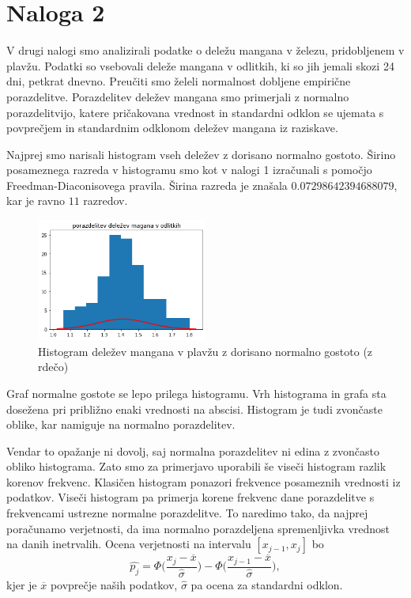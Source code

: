 \documentclass{article}
\begin{document}
\section{Naloga 2}

V drugi nalogi smo analizirali podatke o deležu mangana v železu, pridobljenem v plavžu.
Podatki so vsebovali deleže mangana v odlitkih, ki so jih jemali skozi 24 dni, petkrat dnevno.
Preučiti smo želeli normalnost dobljene empirične porazdelitve. Porazdelitev deležev
mangana smo primerjali z normalno porazdelitvijo, katere pričakovana vrednost in standardni odklon
se ujemata s povprečjem in standardnim odklonom deležev mangana iz raziskave.

Najprej smo narisali histogram vseh deležev z dorisano normalno gostoto. Širino posameznega razreda v histogramu 
smo kot v nalogi 1 izračunali s pomočjo Freedman-Diaconisovega pravila. Širina razreda je znašala
$0.07298642394688079$, kar je ravno $11$ razredov.

\begin{figure}[H]
    \begin{center}
        \includegraphics*[width=0.5\textwidth]{figure2A.png}
        \caption{Histogram deležev mangana v plavžu z dorisano normalno gostoto (z rdečo)}
        \label{2A}
    \end{center}
\end{figure}

Graf normalne gostote se lepo prilega histogramu. Vrh histograma in grafa sta dosežena pri 
približno enaki vrednosti na abscisi. Histogram je tudi zvončaste oblike, kar namiguje na normalno porazdelitev.

Vendar to opažanje ni dovolj, saj normalna porazdelitev ni edina z zvončasto obliko histograma.
Zato smo za primerjavo uporabili še viseči histogram razlik korenov frekvenc.
Klasičen histogram ponazori frekvence posameznih vrednosti iz podatkov. 
Viseči histogram pa primerja korene frekvenc dane porazdelitve s frekvencami ustrezne normalne porazdelitve.
To naredimo tako, da najprej poračunamo verjetnosti, da ima normalno porazdeljena spremenljivka 
vrednost na danih inetrvalih. Ocena verjetnosti na intervalu $[x_{j-1}, x_j]$ bo
\begin{equation}
    \hat{p_j} = \Phi \biggl(\frac{x_j - \overline{x}}{\hat{\sigma}}\biggr) - \Phi\biggl(\frac{x_{j-1} - \overline{x}}{\hat{\sigma}}\biggr),
\end{equation}
kjer je $\overline{x}$ povprečje naših podatkov, $\hat{\sigma}$ pa ocena za standardni odklon.
\end{document}
